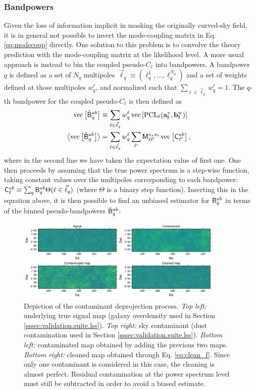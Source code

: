 \documentclass[usenatbib]{mnrasb}
\begin{document}
      \subsubsection{Bandpowers}\label{sssec:maths.pcl101.bpws}
        Given the loss of information implicit in masking the originally curved-sky field, it is in general not possible to invert the mode-coupling matrix in Eq. \ref{eq:modecoup} directly. One solution to this problem is to convolve the theory prediction with the mode-coupling matrix at the likelihood level. A more usual approach is instead to bin the coupled pseudo-$C_\ell$ into bandpowers. A bandpower $q$ is defined as a set of $N_q$ multipoles $\vec{\ell}_q\equiv(\ell_q^1,...,\ell_q^{N_q})$ and a set of weights defined at those multipoles $w^\ell_q$, and normalized such that $\sum_{\ell\in\vec{\ell}_q}w_q^\ell=1$. The $q$-th bandpower for the coupled pseudo-$C_\ell$ is then defined as
        \begin{align}\label{eq:bpws}
          {\rm vec}\left[\tilde{\sf B}^{ab}_q\right]&\equiv\sum_{\ell\in\vec{\ell}_q}w_q^\ell\,{\rm vec}\left[{\rm PCL}_{\ell}({\bf a}^v_{\bf l},{\bf b}^w_{\bf l})\right]\\\nonumber
          \left\langle{\rm vec}\left[\tilde{\sf B}^{ab}_q\right]\right\rangle&=\sum_{\ell\in\vec{\ell}_q}w_q^\ell\sum_{\ell'}{\sf M}^{s_as_b}_{\ell\ell'}\,{\rm vec}\left[{\sf C}^{ab}_{\ell'}\right],
        \end{align}
        where in the second line we have taken the expectation value of first one. One then proceeds by assuming that the true power spectrum is a step-wise function, taking constant values over the multipoles corresponding to each bandpower: ${\sf C}^{ab}_\ell\equiv\sum_q{\sf B}^{ab}_q\Theta(\ell\in\vec{\ell}_q)$ (where $\Theta$ is a binary step function). Inserting this in the equation above, it is then possible to find an unbiased estimator for ${\sf B}^{ab}_q$ in terms of the binned pseudo-bandpowers $\tilde{\sf B}^{ab}_q$:
        \begin{figure}
          \centering
          \includegraphics[width=0.9\textwidth]{maps_contamination}
          \caption{Depiction of the contaminant deprojection process. {\sl Top left:} underlying true signal map (galaxy overdensity used in Section \ref{sssec:validation.suite.lss}). {\sl Top right:} sky contaminant (dust contamination used in Section \ref{sssec:validation.suite.lss}). {\sl Bottom left:} contaminated map obtained by adding the previous two maps. {\sl Bottom right:} cleaned map obtained through Eq. \ref{eq:clean_f}. Since only one contaminant is considered in this case, the cleaning is almost perfect. Residual contamination at the power spectrum level must still be subtracted in order to avoid a biased estimate.}
          \label{fig:lss_cont}
        \end{figure}
\end{document}
